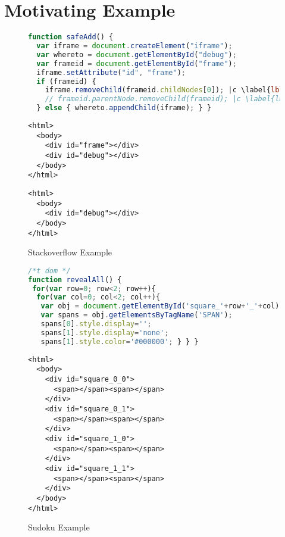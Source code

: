 \documentclass[sigconf]{acmart}
\begin{document}
\section{Motivating Example}
\label{sec.example}

\begin{figure}[t]
  \begin{lstlisting}[style=htmlcssjs,language=JavaScript]
function safeAdd() {
  var iframe = document.createElement("iframe");
  var whereto = document.getElementById("debug");
  var frameid = document.getElementById("frame");
  iframe.setAttribute("id", "frame");
  if (frameid) { 
    iframe.removeChild(frameid.childNodes[0]); |c \label{lbl:error} |c
    // frameid.parentNode.removeChild(frameid); |c \label{lbl:correction} |c
  } else { whereto.appendChild(iframe); } }  
  \end{lstlisting}

  \begin{lstlisting}[style=htmlcssjs, language=HTML5]
<html>
  <body>
    <div id="frame"></div>
    <div id="debug"></div>
  </body>
</html>
  \end{lstlisting}

  \begin{lstlisting}[style=htmlcssjs, language=HTML5]
<html>
  <body>
    <div id="debug"></div>
  </body>
</html>
\end{lstlisting}    
  \caption{Stackoverflow Example}
  \label{fig..safeAdd.js}
\end{figure}


\begin{figure}[t]
  \begin{lstlisting}[style=htmlcssjs,language=JavaScript]
/*t dom */
function revealAll() {
 for(var row=0; row<2; row++){
  for(var col=0; col<2; col++){
   var obj = document.getElementById('square_'+row+'_'+col);
   var spans = obj.getElementsByTagName('SPAN');
   spans[0].style.display='';
   spans[1].style.display='none';
   spans[1].style.color='#000000'; } } }
  \end{lstlisting}

  \begin{lstlisting}[style=htmlcssjs, language=HTML5]
<html>
  <body>
    <div id="square_0_0">
      <span></span><span></span>
    </div>
    <div id="square_0_1">
      <span></span><span></span>
    </div>
    <div id="square_1_0">
      <span></span><span></span>
    </div>
    <div id="square_1_1">
      <span></span><span></span>
    </div>
  </body>
</html>
  \end{lstlisting}  
  \caption{Sudoku Example}
  \label{fig.revealAll.js}
\end{figure}
\end{document}

